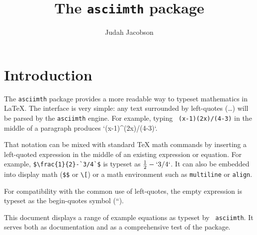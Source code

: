 \documentclass{article}
\title{The {\tt asciimth} package}
\author{Judah Jacobson}
\begin{document}
\maketitle

\section{Introduction}
The {\tt asciimth} package provides a more readable way to typeset
mathematics in \LaTeX{}.  The interface is very simple: any text surrounded by
left-quotes (\ldots{}) will be parsed by the {\tt asciimth}
engine.  For example, typing {\tt{} (x-1)(2x)/(4-3)} in
the middle of a paragraph produces `(x-1)^(2x)/(4-3)`.  

That notation can be mixed with standard \TeX{} math commands by
inserting a left-quoted expression in the middle of an existing expression or
equation.  For example, \verb|$\frac{1}{2}-`3/4`$| is typeset as 
$\frac{1}{2}-`3/4`$.  It can also be embedded into display math
(\verb|$$| or \verb|\[|) or a math environment such as {\tt multiline} or
\texttt{align}.

For compatibility with the common use of left-quotes, the empty expression 
{\tt{}} is typeset as the begin-quotes symbol (``).

This document displays a range of example equations as typeset by {\tt
asciimth}.  It serves both as documentation and as a comprehensive
test of the package.
\end{document}
